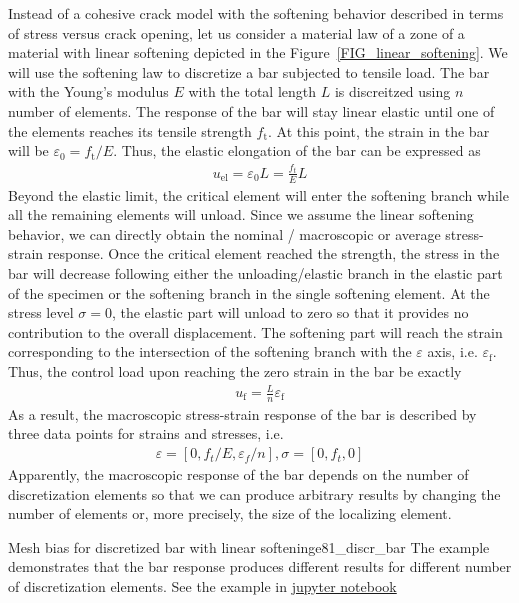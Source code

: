 \documentclass[main.tex]{subfiles}
\begin{document}
Instead of a cohesive crack model with the softening behavior described in terms of stress versus crack opening, let us consider a material law of a zone of a material with linear softening depicted in the Figure~\ref{FIG_linear_softening}. 
We will use the softening law to discretize a bar subjected to tensile load. The bar with the Young's modulus $E$ with the total length $L$ is discreitzed using $n$ number of elements.
The response of the bar will stay linear elastic until one of the elements reaches its tensile strength $f_\mathrm{t}$.
At this point, the strain in the bar will be $\varepsilon_0 = f_\mathrm{t} / E $. 
Thus, the elastic elongation of the bar can be expressed as
\begin{align}
u_\mathrm{el} = \varepsilon_0 L = \frac{f_t}{E} L
\end{align}
Beyond the elastic limit, the critical element will enter the softening branch while all the remaining elements will unload. Since we assume the linear softening behavior, we can directly obtain the nominal / macroscopic or average stress-strain response. Once the critical element reached the strength, the stress in the bar will decrease following either the unloading/elastic branch in the elastic part of the specimen or the softening branch in the single softening element. At the stress level $\sigma = 0$, the elastic part will unload to zero so that it provides no contribution to the overall displacement. The softening part will reach the strain corresponding to the intersection of the softening branch with the $\varepsilon$ axis, i.e. $\varepsilon_\mathrm{f}$. Thus, the control load upon reaching the zero strain in the bar be exactly
\begin{align}
u_\mathrm{f}  = \frac{L}{n}  \varepsilon_\mathrm{f}
\end{align}
As a result, the macroscopic stress-strain response of the bar is described by three data points for strains and stresses, i.e. 
\begin{align}
\varepsilon = [ 0, f_t/E, \varepsilon_f / n ], \sigma = [0, f_t, 0]
\end{align}
Apparently, the macroscopic response of the bar depends on the number of discretization elements so that we can produce arbitrary results by changing the number of elements or, more precisely, the size of the localizing element.

\begin{bmcsex}{Mesh bias for discretized bar with linear softening}{e81_discr_bar}
The example demonstrates that the bar response produces different results for 
different number of discretization elements.
See the example in \href{http://localhost:8888/tree/Examples/8.1 Mesh bias for discretized bar with linear softening.ipynb}{jupyter notebook}
\end{bmcsex}
\end{document}
